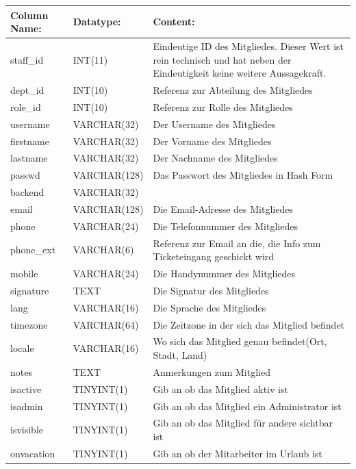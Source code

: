 \begin{table}[]
	\begin{tabular}{|p{3cm}|p{4cm}|p{7.7cm}|}
		\hline
		\textbf{Column Name:} & \textbf{Datatype:} & \textbf{Content:}\\
		\hline
		staff\_id & INT(11) & Eindeutige ID des Mitgliedes. Dieser Wert ist rein technisch und hat neben der Eindeutigkeit keine weitere 
		Aussagekraft.\\
		\hline
		dept\_id & INT(10) & Referenz zur Abteilung des Mitgliedes \\
		\hline
		role\_id & INT(10) & Referenz zur Rolle des Mitgliedes\\
		\hline
		username & VARCHAR(32) & Der Username des Mitgliedes\\
		\hline
		firstname & VARCHAR(32) & Der Vorname des Mitgliedes\\
		\hline
		lastname & VARCHAR(32) &  Der Nachname des Mitgliedes\\
		\hline
		passwd & VARCHAR(128) & Das Passwort des Mitgliedes in Hash Form \\
		\hline
		backend & VARCHAR(32) & \\
		\hline
		email & VARCHAR(128) & Die Email-Adresse des Mitgliedes \\
		\hline
		phone & VARCHAR(24) & Die Telefonnummer des Mitgliedes \\
		\hline
		phone\_ext & VARCHAR(6) & Referenz zur Email an die, die Info zum Ticketeingang geschickt wird \\
		\hline
		mobile & VARCHAR(24) & Die Handynummer des Mitgliedes \\
		\hline
		signature & TEXT & Die Signatur des Mitgliedes \\
		\hline
		lang & VARCHAR(16) & Die Sprache des Mitgliedes \\
		\hline
		timezone & VARCHAR(64) & Die Zeitzone in der sich das Mitglied befindet \\
		\hline
		locale & VARCHAR(16)& Wo sich das Mitglied genau befindet(Ort, Stadt, Land) \\
		\hline
		notes & TEXT & Anmerkungen zum Mitglied\\
		\hline
		isactive & TINYINT(1) & Gib an ob das Mitglied aktiv ist\\
		\hline
		isadmin & TINYINT(1) & Gib an ob das Mitglied ein Administrator ist\\
		\hline
		isvisible & TINYINT(1) & Gib an ob das Mitglied für andere sichtbar ist \\
		\hline
		onvacation & TINYINT(1) & Gib an ob der Mitarbeiter im Urlaub ist \\

\end{tabular}
\end{table}
